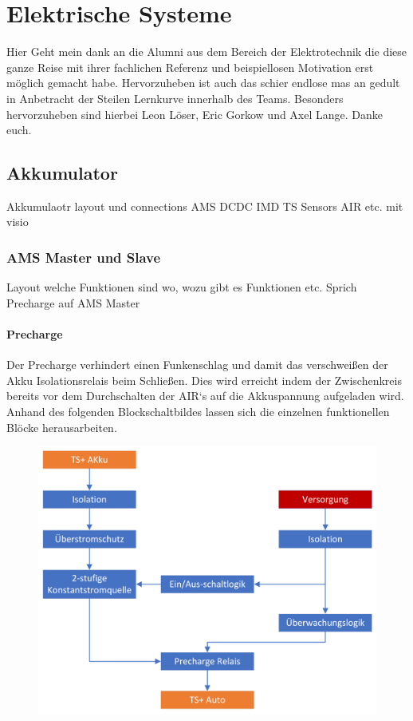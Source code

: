 
\chapter{Elektrische Systeme}
Hier Geht mein dank an die Alumni aus dem Bereich der Elektrotechnik die diese ganze Reise mit ihrer fachlichen Referenz und beispiellosen Motivation erst möglich gemacht habe. Hervorzuheben ist auch das schier endlose mas an gedult in Anbetracht der Steilen Lernkurve innerhalb des Teams. Besonders hervorzuheben sind hierbei Leon Löser, Eric Gorkow und Axel Lange. Danke euch.
\section{Akkumulator}
Akkumulaotr layout und connections
	AMS DCDC IMD TS Sensors AIR etc. mit visio

\subsection{AMS Master und Slave}
Layout welche Funktionen sind wo, wozu gibt es Funktionen etc.
Sprich Precharge auf AMS Master

\subsubsection{Precharge}
Der Precharge verhindert einen Funkenschlag und damit das verschweißen der Akku Isolationsrelais beim Schließen. Dies wird erreicht indem der Zwischenkreis bereits vor dem Durchschalten der AIR`s auf die Akkuspannung aufgeladen wird. Anhand des folgenden Blockschaltbildes lassen sich die einzelnen funktionellen Blöcke herausarbeiten.

\begin{figure}
	\centering
	\includegraphics[width=0.7\linewidth]{"bilder/Precharge Blockschaltbild"}
	\caption{}
	\label{fig:precharge-blockschaltbild}
\end{figure}

